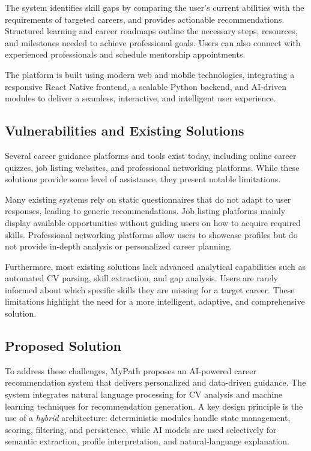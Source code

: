 \documentclass[12pt,a4paper]{article}
\begin{document}
The system identifies skill gaps by comparing the user's current abilities with the requirements of targeted careers, and provides actionable recommendations. Structured learning and career roadmaps outline the necessary steps, resources, and milestones needed to achieve professional goals. Users can also connect with experienced professionals and schedule mentorship appointments.

The platform is built using modern web and mobile technologies, integrating a responsive React Native frontend, a scalable Python backend, and AI-driven modules to deliver a seamless, interactive, and intelligent user experience.

\subsection{Vulnerabilities and Existing Solutions}

Several career guidance platforms and tools exist today, including online career quizzes, job listing websites, and professional networking platforms. While these solutions provide some level of assistance, they present notable limitations.

Many existing systems rely on static questionnaires that do not adapt to user responses, leading to generic recommendations. Job listing platforms mainly display available opportunities without guiding users on how to acquire required skills. Professional networking platforms allow users to showcase profiles but do not provide in-depth analysis or personalized career planning.

Furthermore, most existing solutions lack advanced analytical capabilities such as automated CV parsing, skill extraction, and gap analysis. Users are rarely informed about which specific skills they are missing for a target career. These limitations highlight the need for a more intelligent, adaptive, and comprehensive solution.

\subsection{Proposed Solution}

To address these challenges, MyPath proposes an AI-powered career recommendation system that delivers personalized and data-driven guidance. The system integrates natural language processing for CV analysis and machine learning techniques for recommendation generation. A key design principle is the use of a \emph{hybrid} architecture: deterministic modules handle state management, scoring, filtering, and persistence, while AI models are used selectively for semantic extraction, profile interpretation, and natural-language explanation.
\end{document}
